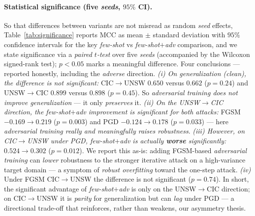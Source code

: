 \documentclass[preprint,12pt,authoryear]{elsarticle}
\begin{document}
\paragraph{Statistical significance (five \emph{seeds}, $95\%$ CI).} So that
differences between variants are not misread as random \emph{seed} effects,
Table~\ref{tab:significance} reports MCC as mean $\pm$ standard deviation with $95\%$
confidence intervals for the key \emph{few-shot} vs \emph{few-shot$+$adv}
comparison, and we state significance via a \emph{paired $t$-test} over five
\emph{seeds} (accompanied by the Wilcoxon signed-rank test); $p<0.05$ marks a
meaningful difference. Four conclusions --- reported honestly, including the
\emph{adverse} direction. \emph{(i) On generalization (clean), the difference is not
significant:} CIC$\rightarrow$UNSW $0.650$ versus $0.662$ ($p{=}0.24$) and
UNSW$\rightarrow$CIC $0.899$ versus $0.898$ ($p{=}0.45$). So \emph{adversarial
training does not improve generalization} --- it only \emph{preserves} it. \emph{(ii)
On the UNSW$\rightarrow$CIC direction, the few-shot$+$adv improvement is significant
for both attacks:} FGSM $-0.169\rightarrow0.219$ ($p{=}0.003$) and PGD
$-0.124\rightarrow0.178$ ($p{=}0.033$) --- here \emph{adversarial training really and
meaningfully raises robustness}. \emph{(iii) However, on CIC$\rightarrow$UNSW under
PGD, few-shot$+$adv is actually \textbf{worse} significantly:}
$0.524\rightarrow0.302$ ($p{=}0.012$). We report this as-is: adding FGSM-based
\emph{adversarial training} can \emph{lower} robustness to the stronger iterative
attack on a high-variance target domain --- a symptom of \emph{robust overfitting}
toward the one-step attack. \emph{(iv)} Under FGSM CIC$\rightarrow$UNSW the
difference is not significant ($p{=}0.74$). In short, the significant advantage of
\emph{few-shot$+$adv} is only on the UNSW$\rightarrow$CIC direction; on
CIC$\rightarrow$UNSW it is \emph{parity} for generalization but can \emph{lag} under
PGD --- a directional trade-off that reinforces, rather than weakens, our asymmetry
thesis.
\end{document}
